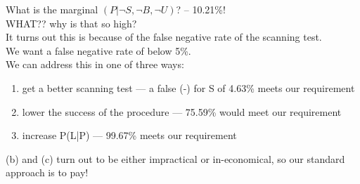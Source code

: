 \documentclass[../../lecture_notes.tex]{subfiles}
\begin{document}
\noindent What is the marginal $(P|\neg S, \neg B, \neg U)$? -- 10.21\%!\\
WHAT?? why is that so high?\\
It turns out this is because of the false negative rate of the scanning test.\\
We want a false negative rate of below 5\%.\\
We can address this in one of three ways:
	\begin{enumerate} [itemsep=0mm]
		\item get a better scanning test — a false (-) for S of 4.63\% meets our requirement
		\item lower the success of the procedure — 75.59\% would meet our requirement
		\item increase P(L|P) — 99.67\% meets our requirement
	\end{enumerate}
	(b) and (c) turn out to be either impractical or in-economical, so our standard approach is to pay!
\end{document}
